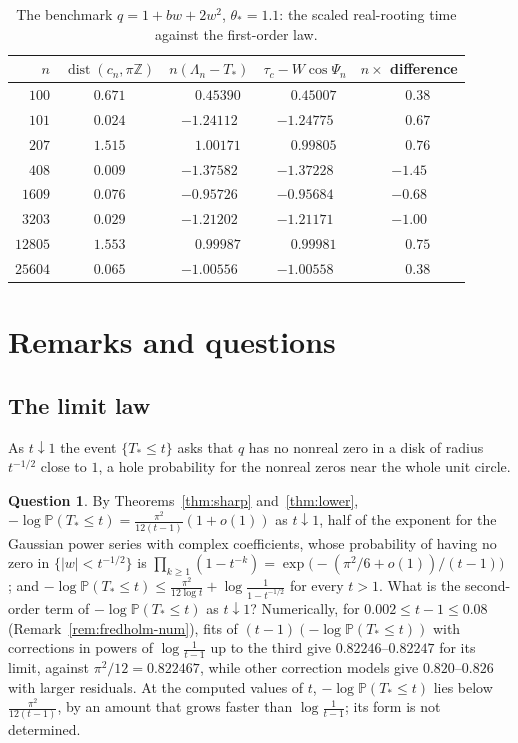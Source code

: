 \documentclass[11pt]{amsart}
\theoremstyle{definition}
\newtheorem{question}[theorem]{Question}
\theoremstyle{remark}
\numberwithin{equation}{section}
\newcommand{\Z}{\mathbb{Z}}
\newcommand{\PP}{\mathbb{P}}
\DeclareMathOperator{\dist}{dist}
\begin{document}
\begin{table}[ht]
\caption{The benchmark $q=1+bw+2w^2$, $\theta_*=1.1$: the scaled real-rooting time against the first-order law.}
\label{tab:benchmark}
\begin{tabular}{rcccc}
$n$ & $\dist(c_n,\pi\Z)$ & $n(\Lambda_n-T_*)$ & $\tau_c-W\cos\Psi_n$ & $n\times$ difference\\\hline
$100$ & $0.671$ & $\phantom{-}0.45390$ & $\phantom{-}0.45007$ & $\phantom{-}0.38$\\
$101$ & $0.024$ & $-1.24112$ & $-1.24775$ & $\phantom{-}0.67$\\
$207$ & $1.515$ & $\phantom{-}1.00171$ & $\phantom{-}0.99805$ & $\phantom{-}0.76$\\
$408$ & $0.009$ & $-1.37582$ & $-1.37228$ & $-1.45$\\
$1609$ & $0.076$ & $-0.95726$ & $-0.95684$ & $-0.68$\\
$3203$ & $0.029$ & $-1.21202$ & $-1.21171$ & $-1.00$\\
$12805$ & $1.553$ & $\phantom{-}0.99987$ & $\phantom{-}0.99981$ & $\phantom{-}0.75$\\
$25604$ & $0.065$ & $-1.00556$ & $-1.00558$ & $\phantom{-}0.38$\\
\end{tabular}
\end{table}


\section{Remarks and questions}\label{sec:remarks}

\subsection{The limit law}
As $t\downarrow1$ the event $\{T_*\le t\}$ asks that $q$ has no nonreal zero in a disk of radius $t^{-1/2}$ close to $1$, a hole probability for the nonreal zeros near the whole unit circle.

\begin{question}\label{q:law}
By Theorems~\ref{thm:sharp} and~\ref{thm:lower}, $-\log\PP(T_*\le t)=\frac{\pi^2}{12(t-1)}(1+o(1))$ as $t\downarrow1$, half of the exponent for the Gaussian power series with complex coefficients, whose probability of having no zero in $\{|w|<t^{-1/2}\}$ is $\prod_{k\ge1}(1-t^{-k})=\exp\bigl(-(\pi^2/6+o(1))/(t-1)\bigr)$ \cite[Theorem~2(i) and Corollary~3(i)]{PV}; and $-\log\PP(T_*\le t)\le\frac{\pi^2}{12\log t}+\log\frac1{1-t^{-1/2}}$ for every $t>1$. What is the second-order term of $-\log\PP(T_*\le t)$ as $t\downarrow1$? Numerically, for $0.002\le t-1\le0.08$ (Remark~\ref{rem:fredholm-num}), fits of $(t-1)(-\log\PP(T_*\le t))$ with corrections in powers of $\log\frac1{t-1}$ up to the third give $0.82246$--$0.82247$ for its limit, against $\pi^2/12=0.822467$, while other correction models give $0.820$--$0.826$ with larger residuals. At the computed values of $t$, $-\log\PP(T_*\le t)$ lies below $\frac{\pi^2}{12(t-1)}$, by an amount that grows faster than $\log\frac1{t-1}$; its form is not determined.
\end{question}
\end{document}
